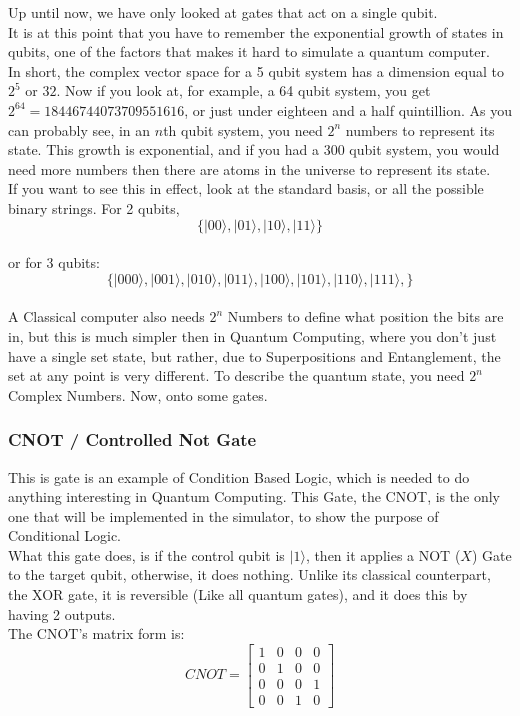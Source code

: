 \documentclass{report}
\begin{document}
Up until now, we have only looked at gates that act on a single qubit.\\
It is at this point that you have to remember the exponential growth of
states in qubits, one of the factors that makes it hard to simulate a
quantum computer.\\
In short, the complex vector space for a 5 qubit system has a dimension
equal to \(2^5\) or \(32\). Now if you look at, for example, a 64 qubit
system, you get \(2^64 = 18446744073709551616\), or just under eighteen
and a half quintillion. As you can probably see, in an \(n\)th qubit
system, you need \(2^n\) numbers to represent its state. This growth is
exponential, and if you had a \(300\) qubit system, you would need more
numbers then there are atoms in the universe to represent its state.\\
If you want to see this in effect, look at the standard basis, or all
the possible binary strings. For 2 qubits,\\
\[
\{\lvert00\rangle, \lvert01\rangle, \lvert10\rangle, \lvert11\rangle\}\]\\
or for 3 qubits:\\
\[
\{\lvert000\rangle, \lvert001\rangle, \lvert010\rangle, \lvert011\rangle, \lvert100\rangle, \lvert101\rangle, \lvert110\rangle, \lvert111\rangle,\}\]\\
A Classical computer also needs \(2^n\) Numbers to define what position
the bits are in, but this is much simpler then in Quantum Computing,
where you don't just have a single set state, but rather, due to
Superpositions and Entanglement, the set at any point is very different.
To describe the quantum state, you need \(2^n\) Complex Numbers. Now,
onto some gates.

\subsubsection{CNOT / Controlled Not Gate}

This is gate is an example of Condition Based Logic, which is needed to
do anything interesting in Quantum Computing. This Gate, the CNOT, is
the only one that will be implemented in the simulator, to show the
purpose of Conditional Logic. \\
What this gate does, is if the control qubit is \(\lvert1\rangle\), then it
applies a NOT (\(X\)) Gate to the target qubit, otherwise, it does
nothing. Unlike its classical counterpart, the XOR gate, it is
reversible (Like all quantum gates), and it does this by having 2
outputs.\\
The CNOT's matrix form is:\\
\[
CNOT = \left[ \begin{matrix} 1 & 0 & 0 & 0 \\ 0 & 1 & 0 & 0 \\ 0     & 0 & 0 & 1 \\ 0 & 0 & 1  & 0\end{matrix} \right]\]
\end{document}
